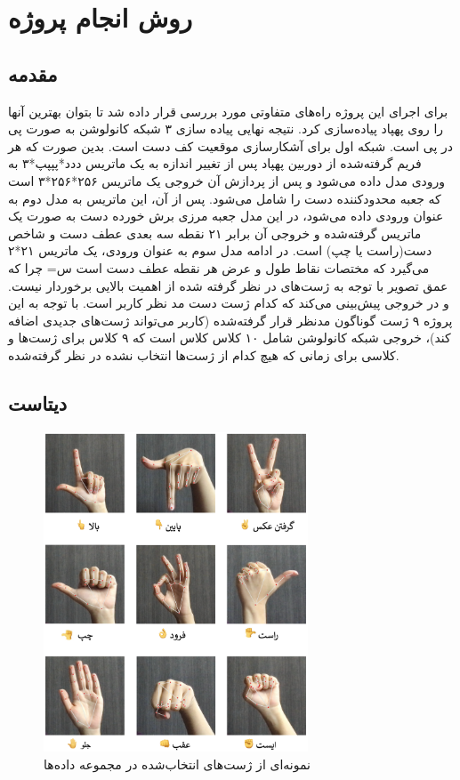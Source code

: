 \chapter{روش انجام پروژه}
\section{مقدمه}

برای اجرای این پروژه راه‌های متفاوتی مورد بررسی قرار داده شد تا بتوان بهترین آنها را روی پهپاد پیاده‌سازی کرد. نتیجه نهایی پیاده سازی ۳ شبکه کانولوشن
به صورت پی در پی است. شبکه اول برای آشکارسازی موقعیت کف دست است. بدین صورت که هر فریم گرفته‌شده از دوربین پهپاد 
پس از تغییر اندازه به یک ماتریس ددد*پپپپ*۳ به ورودی مدل داده می‌شود و پس از پردازش آن خروجی یک ماتریس ۲۵۶*۲۵۶*۳ است که جعبه محدودکننده 
دست را شامل می‌شود. پس از آن، این ماتریس به مدل دوم به عنوان ورودی داده می‌شود، در این مدل جعبه مرزی برش خورده دست به صورت یک ماتریس گرفته‌شده و خروجی آن برابر ۲۱ نقطه 
سه بعدی عطف دست و شاخص دست(راست یا چپ) است.  در ادامه مدل سوم به عنوان ورودی، یک ماتریس ۲۱*۲ می‌گیرد که مختصات نقاط  طول و عرض هر نقطه عطف دست است س=
چرا که عمق تصویر با توجه به ژست‌های در نظر گرفته شده از اهمیت بالایی برخوردار نیست. و در خروجی پیش‌بینی می‌کند که کدام ژست دست مد نظر کاربر است. با توجه به این پروژه ۹ ژست 
گوناگون مدنظر قرار گرفته‌شده (کاربر می‌تواند ژست‌های جدیدی اضافه کند)، خروجی شبکه کانولوشن شامل ۱۰ کلاس 
کلاس است که ۹ کلاس برای ژست‌ها و کلاسی برای زمانی که هیچ کدام از ژست‌ها انتخاب نشده در نظر گرفته‌شده.


\section{دیتاست}

\begin{figure}[h]
    \centering
    \includegraphics[width=0.7\textwidth]{gestures.png}
    \caption{نمونه‌ای از ژست‌های انتخاب‌شده در مجموعه داده‌ها}
\end{figure}




